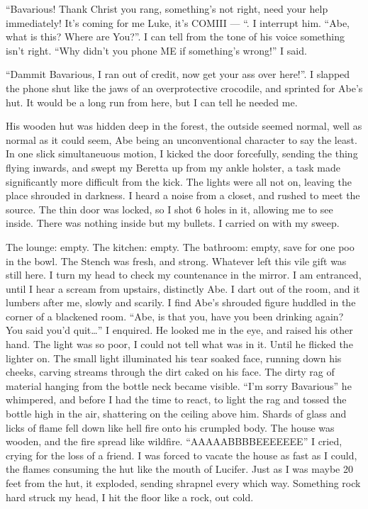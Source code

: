 ``Bavarious! Thank Christ you rang, something's not
right, need your help immediately! It's coming for me Luke,
it's COMIII --- ``. I interrupt him. ``Abe,
what is this? Where are You?''. I can tell from the tone of
his voice something isn't right. ``Why didn't you
phone ME if something's wrong!'' I said.



``Dammit Bavarious, I ran out of credit, now get your ass over
here!''. I slapped the phone shut like the jaws of an
overprotective crocodile, and sprinted for Abe's hut. It
would be a long run from here, but I can tell he needed me.



His wooden hut was hidden deep in the forest, the outside seemed
normal, well as normal as it could seem, Abe being an
unconventional character to say the least. In one slick
simultaneuous motion, I kicked the door forcefully, sending the
thing flying inwards, and swept my Beretta up from my ankle
holster, a task made significantly more difficult from the kick.
The lights were all not on, leaving the place shrouded in darkness.
I heard a noise from a closet, and rushed to meet the source. The
thin door was locked, so I shot 6 holes in it, allowing me to see
inside. There was nothing inside but my bullets. I carried on with
my sweep.



The lounge: empty. The kitchen: empty. The bathroom: empty, save
for one poo in the bowl. The Stench was fresh, and strong. Whatever
left this vile gift was still here. I turn my head to check my
countenance in the mirror. I am entranced, until I hear a scream
from upstairs, distinctly Abe. I dart out of the room, and it
lumbers after me, slowly and scarily. I find Abe's shrouded
figure huddled in the corner of a blackened room. ``Abe, is
that you, have you been drinking again? You said you'd
quit{\ldots}'' I enquired. He looked me in the eye, and raised his
other hand. The light was so poor, I could not tell what was in it.
Until he flicked the lighter on. The small light illuminated his
tear soaked face, running down his cheeks, carving streams through
the dirt caked on his face. The dirty rag of material hanging from
the bottle neck became visible. ``I'm sorry
Bavarious'' he whimpered, and before I had the time to react,
to light the rag and tossed the bottle high in the air, shattering
on the ceiling above him. Shards of glass and licks of flame fell
down like hell fire onto his crumpled body. The house was wooden,
and the fire spread like wildfire. ``AAAAABBBBEEEEEEE'' I
cried, crying for the loss of a friend. I was forced to vacate the
house as fast as I could, the flames consuming the hut like the
mouth of Lucifer. Just as I was maybe 20 feet from the hut, it
exploded, sending shrapnel every which way. Something rock hard
struck my head, I hit the floor like a rock, out cold.



